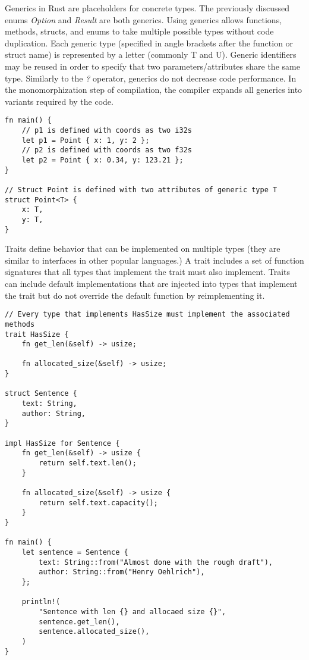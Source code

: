 \documentclass[12pt]{article}
\begin{document}
\begin{flushleft}
Generics in Rust are placeholders for concrete types. The previously discussed
enums \textit{Option} and \textit{Result} are both generics. Using generics
allows functions, methods, structs, and enums to take multiple possible types
without code duplication. Each generic type (specified in angle brackets after
the function or struct name) is represented by a letter (commonly T and U).
Generic identifiers may be reused in order to specify that two
parameters/attributes share the same type. Similarly to the \textit{?}
operator, generics do not decrease code performance. In the monomorphization
step of compilation, the compiler expands all generics into variants required
by the code.

\singlespacing{}
\begin{verbatim}
fn main() {
    // p1 is defined with coords as two i32s
    let p1 = Point { x: 1, y: 2 };
    // p2 is defined with coords as two f32s
    let p2 = Point { x: 0.34, y: 123.21 };
}

// Struct Point is defined with two attributes of generic type T
struct Point<T> {
    x: T,
    y: T,
}
\end{verbatim}
\doublespacing{}

Traits define behavior that can be implemented on multiple types (they are
similar to interfaces in other popular languages.) A trait includes a set of
function signatures that all types that implement the trait must also
implement. Traits can include default implementations that are injected into
types that implement the trait but do not override the default function by
reimplementing it.

\singlespacing{}
\begin{verbatim}
// Every type that implements HasSize must implement the associated methods
trait HasSize {
    fn get_len(&self) -> usize;

    fn allocated_size(&self) -> usize;
}

struct Sentence {
    text: String,
    author: String,
}

impl HasSize for Sentence {
    fn get_len(&self) -> usize {
        return self.text.len();
    }

    fn allocated_size(&self) -> usize {
        return self.text.capacity();
    }
}

fn main() {
    let sentence = Sentence {
        text: String::from("Almost done with the rough draft"),
        author: String::from("Henry Oehlrich"),
    };

    println!(
        "Sentence with len {} and allocaed size {}",
        sentence.get_len(),
        sentence.allocated_size(),
    )
}
\end{verbatim}
\doublespacing{}


\end{flushleft}
\end{document}
